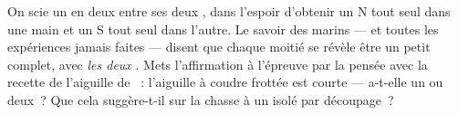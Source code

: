 \begin{exercise}[$\star\star$]\label{exo:g4:magnets-and-compass:11}
On scie un  en deux entre ses deux , dans l'espoir
d'obtenir un N tout seul dans une main et un S tout seul dans
l'autre. Le savoir des marins --- et toutes les expériences jamais
faites --- disent que chaque moitié se révèle être un petit 
complet, avec \emph{les deux} . Mets l'affirmation à l'épreuve
par la pensée avec la recette de l'aiguille de ~: l'aiguille
à coudre frottée est courte --- a-t-elle un  ou deux~? Que cela
suggère-t-il sur la chasse à un  isolé par découpage~?
\end{exercise}
